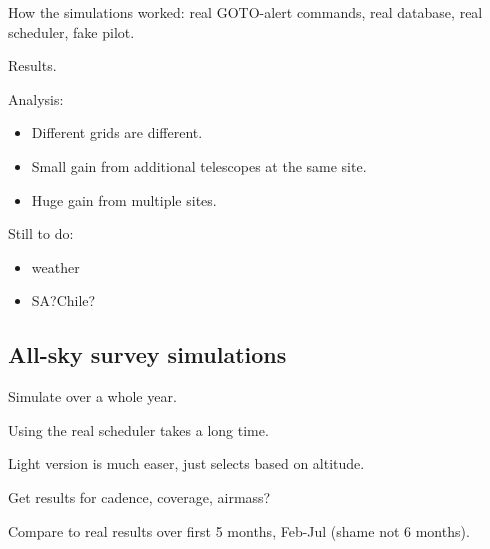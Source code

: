 \begin{colsection}
\begin{colsection}
How the simulations worked: real GOTO-alert commands, real database, real scheduler, fake pilot.

Results.

Analysis:
\begin{itemize}
    \item Different grids are different.
    \item Small gain from additional telescopes at the same site.
    \item Huge gain from multiple sites.
\end{itemize}

Still to do:
\begin{itemize}
    \item weather
    \item SA?\@ Chile?
\end{itemize}

\end{colsection}


\subsection{All-sky survey simulations}
\label{sec:allsky_sims}
\begin{colsection}

Simulate over a whole year.

Using the real scheduler takes a long time.

Light version is much easer, just selects based on altitude.

Get results for cadence, coverage, airmass?

Compare to real results over first 5 months, Feb-Jul (shame not 6 months).

\end{colsection}


\end{colsection}

